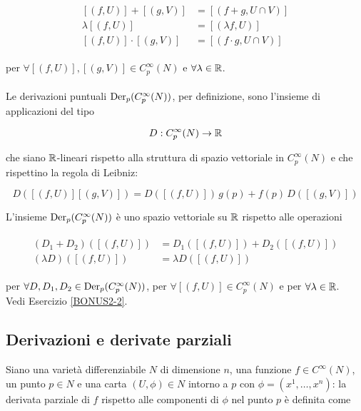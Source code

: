 \begin{align}
	\begin{split}
		[(f,U)] + [(g,V)] &= [(f+g , U \cap V)]\\
		\lambda [(f,U)] &= [(\lambda f,U)]\\
		[(f,U)] \cdot [(g,V)] &= [(f \cdot g , U \cap V)]
	\end{split}
\end{align}

per $ \forall [(f,U)], [(g,V)] \in C_{p}^{\infty}(N) $ e $ \forall \lambda \in \mathbb{R} $.\\\\
%
Le derivazioni puntuali $ \operatorname{Der}_{p}(C_{p}^{\infty}(N)) $, per definizione, sono l'insieme di applicazioni del tipo

\begin{equation}
	D : C_{p}^{\infty}(N) \to \mathbb{R}
\end{equation}

che siano $ \mathbb{R} $-lineari rispetto alla struttura di spazio vettoriale in $ C_{p}^{\infty}(N) $ e che rispettino la regola di Leibniz:

\begin{equation}
	D([(f,U)] [(g,V)]) = D([(f,U)]) \, g(p) + f(p) \, D([(g,V)])
\end{equation}

L'insieme $ \operatorname{Der}_{p}(C_{p}^{\infty}(N)) $ è uno spazio vettoriale su $ \mathbb{R} $ rispetto alle operazioni

\begin{align}
	\begin{split}
		(D_{1} + D_{2})([(f,U)]) &= D_{1}([(f,U)]) + D_{2}([(f,U)])\\
		(\lambda D)([(f,U)]) &= \lambda D([(f,U)])
	\end{split}
\end{align}

per $ \forall D,D_{1},D_{2} \in \operatorname{Der}_{p}(C_{p}^{\infty}(N)) $, per $ \forall [(f,U)] \in C_{p}^{\infty}(N) $ e per $ \forall \lambda \in \mathbb{R} $.\\
Vedi Esercizio \ref{BONUS2-2}.

\subsection{Derivazioni e derivate parziali}

Siano una varietà differenziabile $ N $ di dimensione $ n $, una funzione $ f \in C^{\infty}(N) $, un punto $ p \in N $ e una carta $ (U, \phi) \in N $ intorno a $ p $ con $ \phi = (x^{1},\dots,x^{n}) $: la derivata parziale di $ f $ rispetto alle componenti di $ \phi $ nel punto $ p $ è definita come

